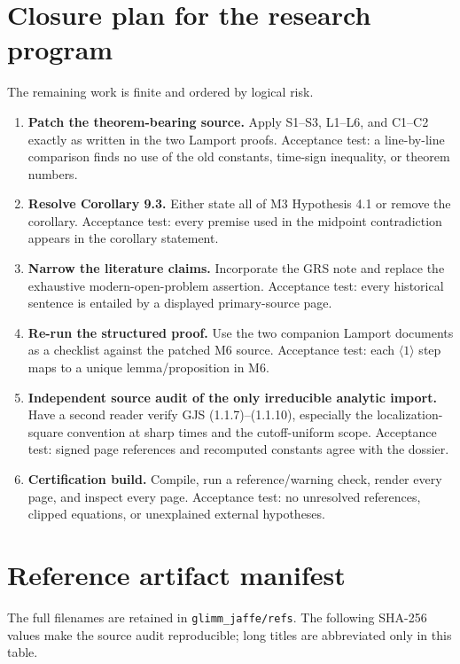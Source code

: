 \documentclass[10pt,a4paper]{article}
\begin{document}
\section{Closure plan for the research program}

The remaining work is finite and ordered by logical risk.

\begin{enumerate}[label=\textup{C\arabic*.}]
\item \textbf{Patch the theorem-bearing source.}  Apply S1--S3, L1--L6, and C1--C2
exactly as written in the two Lamport proofs.  Acceptance test: a line-by-line comparison
finds no use of the old constants, time-sign inequality, or theorem numbers.
\item \textbf{Resolve Corollary 9.3.}  Either state all of M3 Hypothesis 4.1 or remove the
corollary.  Acceptance test: every premise used in the midpoint contradiction appears in
the corollary statement.
\item \textbf{Narrow the literature claims.}  Incorporate the GRS note and replace the
exhaustive modern-open-problem assertion.  Acceptance test: every historical sentence is
entailed by a displayed primary-source page.
\item \textbf{Re-run the structured proof.}  Use the two companion Lamport documents as a
checklist against the patched M6 source.  Acceptance test: each $\langle1\rangle$ step maps
to a unique lemma/proposition in M6.
\item \textbf{Independent source audit of the only irreducible analytic import.}  Have a
second reader verify GJS (1.1.7)--(1.1.10), especially the localization-square convention
at sharp times and the cutoff-uniform scope.  Acceptance test: signed page references and
recomputed constants agree with the dossier.
\item \textbf{Certification build.}  Compile, run a reference/warning check, render every
page, and inspect every page.  Acceptance test: no unresolved references, clipped equations,
or unexplained external hypotheses.
\end{enumerate}

\section{Reference artifact manifest}

The full filenames are retained in \texttt{glimm\_jaffe/refs}.  The following SHA-256
values make the source audit reproducible; long titles are abbreviated only in this table.
\end{document}
